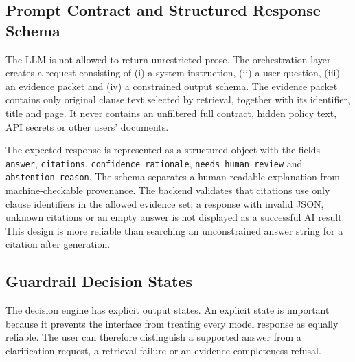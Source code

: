 \documentclass[12pt,a4paper,oneside]{report}
\begin{document}
\subsection{Prompt Contract and Structured Response Schema}
The LLM is not allowed to return unrestricted prose. The orchestration layer creates a request consisting of (i) a system instruction, (ii) a user question, (iii) an evidence packet and (iv) a constrained output schema. The evidence packet contains only original clause text selected by retrieval, together with its identifier, title and page. It never contains an unfiltered full contract, hidden policy text, API secrets or other users' documents.

The expected response is represented as a structured object with the fields \texttt{answer}, \texttt{citations}, \texttt{confidence\_rationale}, \texttt{needs\_human\_review} and \texttt{abstention\_reason}. The schema separates a human-readable explanation from machine-checkable provenance. The backend validates that citations use only clause identifiers in the allowed evidence set; a response with invalid JSON, unknown citations or an empty answer is not displayed as a successful AI result. This design is more reliable than searching an unconstrained answer string for a citation after generation.



\subsection{Guardrail Decision States}
The decision engine has explicit output states. An explicit state is important because it prevents the interface from treating every model response as equally reliable. The user can therefore distinguish a supported answer from a clarification request, a retrieval failure or an evidence-completeness refusal.
\end{document}
